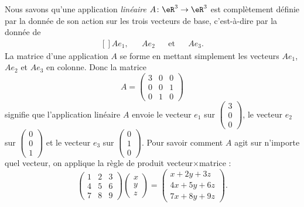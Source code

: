 Nous savons qu'une application \emph{linéaire} \( A\colon \eR^3\to \eR^3\) est complètement définie par la donnée de son action sur les trois vecteurs de base, c'est-à-dire par la donnée de
\begin{equation}
	\begin{aligned}[]
		Ae_1, &  & Ae_2 &  & \text{et} &  & Ae_3.
	\end{aligned}
\end{equation}
La matrice d'une application \( A\) se forme en mettant simplement les vecteurs \( Ae_1\), \( Ae_2\) et \( Ae_3\) en colonne. Donc la matrice
\begin{equation}		\label{EqExempleALin}
	A=\begin{pmatrix}
		3 & 0 & 0 \\
		0 & 0 & 1 \\
		0 & 1 & 0
	\end{pmatrix}
\end{equation}
signifie que l'application linéaire \( A\) envoie le vecteur \( e_1\) sur \( \begin{pmatrix}
	3 \\
	0 \\
	0
\end{pmatrix}\), le vecteur \( e_2\) sur \( \begin{pmatrix}
	0 \\
	0 \\
	1
\end{pmatrix}\) et le vecteur \( e_3\) sur \( \begin{pmatrix}
	0 \\
	1 \\
	0
\end{pmatrix}\).
Pour savoir comment \( A\) agit sur n'importe quel vecteur, on applique la règle de produit vecteur\( \times\)matrice :
\begin{equation}
	\begin{pmatrix}
		1 & 2 & 3 \\
		4 & 5 & 6 \\
		7 & 8 & 9
	\end{pmatrix}\begin{pmatrix}
		x \\
		y \\
		z
	\end{pmatrix}=
	\begin{pmatrix}
		x+2y+3z  \\
		4x+5y+6z \\
		7x+8y+9z
	\end{pmatrix}.
\end{equation}

